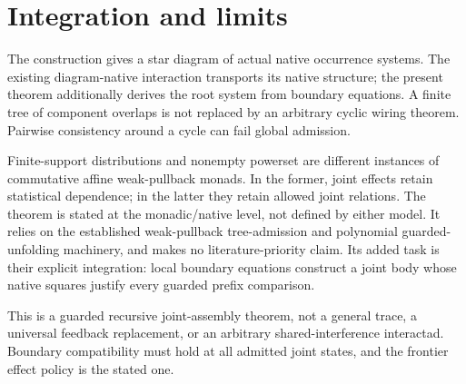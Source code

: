 \documentclass[11pt]{article}
\begin{document}
\section{Integration and limits}
The construction gives a star diagram of actual native occurrence systems. The existing diagram-native interaction transports its native structure; the present theorem additionally derives the root system from boundary equations. A finite tree of component overlaps is not replaced by an arbitrary cyclic wiring theorem. Pairwise consistency around a cycle can fail global admission.

Finite-support distributions and nonempty powerset are different instances of commutative affine weak-pullback monads. In the former, joint effects retain statistical dependence; in the latter they retain allowed joint relations. The theorem is stated at the monadic/native level, not defined by either model. It relies on the established weak-pullback tree-admission and polynomial guarded-unfolding machinery, and makes no literature-priority claim. Its added task is their explicit integration: local boundary equations construct a joint body whose native squares justify every guarded prefix comparison.

This is a guarded recursive joint-assembly theorem, not a general trace, a universal feedback replacement, or an arbitrary shared-interference interactad. Boundary compatibility must hold at all admitted joint states, and the frontier effect policy is the stated one.
\end{document}
